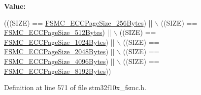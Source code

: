 {\bfseries Value\+:}
\begin{DoxyCode}
(((SIZE) == \hyperlink{group___f_s_m_c___e_c_c___page___size_gaaa1661267b44e6728fa64aca79de54b3}{FSMC\_ECCPageSize\_256Bytes}) || \(\backslash\)
                                    ((SIZE) == \hyperlink{group___f_s_m_c___e_c_c___page___size_gacb4da17c28dde89e38ff4ed40497f6b5}{FSMC\_ECCPageSize\_512Bytes}) || \(\backslash\)
                                    ((SIZE) == \hyperlink{group___f_s_m_c___e_c_c___page___size_ga8137931c96b63ec7e6f80a8c7391433f}{FSMC\_ECCPageSize\_1024Bytes}) || \(\backslash\)
                                    ((SIZE) == \hyperlink{group___f_s_m_c___e_c_c___page___size_gab8f3ae95becd59e71a976b97ded904b8}{FSMC\_ECCPageSize\_2048Bytes}) || \(\backslash\)
                                    ((SIZE) == \hyperlink{group___f_s_m_c___e_c_c___page___size_gaec2e9e434685a1756bd171699248f65a}{FSMC\_ECCPageSize\_4096Bytes}) || \(\backslash\)
                                    ((SIZE) == \hyperlink{group___f_s_m_c___e_c_c___page___size_gab6877a99ddf02e7aa95cf04896ce731d}{FSMC\_ECCPageSize\_8192Bytes}))
\end{DoxyCode}


Definition at line 571 of file stm32f10x\+\_\+fsmc.\+h.

